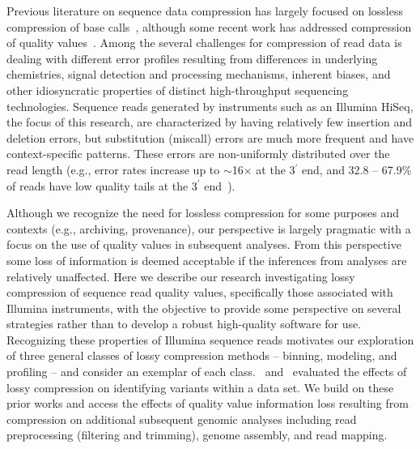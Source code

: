\documentclass{bioinfo}
\begin{document}
Previous literature on sequence data compression has largely focused
on lossless compression of base calls~\cite[reviewed
  in][]{Deorowicz:2013hq,Giancarlo:2014rw,Giancarlo:2009fk,
  Nalbantoglu:2010uq,Zhu:2013qr}, although some recent work has
addressed compression of quality
values~\cite[e.g.,][]{asnani2012lossy,Canovas:2014fr,Hach:2012ys,
  janin2013adaptive,Kozanitis:2011kl,Ochoa:2013rt,Tembe:2010ys,
  Wan:2012kq,DBLP:conf/recomb/YuYB14,zhou2014compression}. Among the
several challenges for compression of read data is dealing with
different error profiles resulting from differences in underlying
chemistries, signal detection and processing mechanisms, inherent
biases, and other idiosyncratic properties of distinct high-throughput
sequencing technologies. Sequence reads generated by instruments such
as an Illumina HiSeq, the focus of this research, are characterized by
having relatively few insertion and deletion errors, but substitution
(miscall) errors are much more frequent and have context-specific
patterns. These errors are non-uniformly distributed over the read
length (e.g., error rates increase up to $\sim$16$\times$ at the
3$^{\prime}$ end, and 32.8 -- 67.9\% of reads have low quality tails
at the 3$^{\prime}$ end~\citep{Minoche:2011km}).

Although we recognize the need for lossless compression for some
purposes and contexts (e.g., archiving, provenance), our perspective
is largely pragmatic with a focus on the use of quality values in
subsequent analyses. From this perspective some loss of information is
deemed acceptable if the inferences from analyses are relatively
unaffected. Here we describe our research investigating lossy
compression of sequence read quality values, specifically those
associated with Illumina instruments, with the objective to provide
some perspective on several strategies rather than to develop a robust
high-quality software for use. Recognizing these properties of
Illumina sequence reads motivates our exploration of three general
classes of lossy compression methods -- binning, modeling, and
profiling -- and consider an exemplar of each
class.~\cite{Canovas:2014fr} and~\cite{janin2013adaptive} evaluated
the effects of lossy compression on identifying variants within a data
set. We build on these prior works and access the effects of
quality value information loss resulting from compression on
additional subsequent genomic analyses including read preprocessing
(filtering and trimming), genome assembly, and read mapping.
\end{document}
